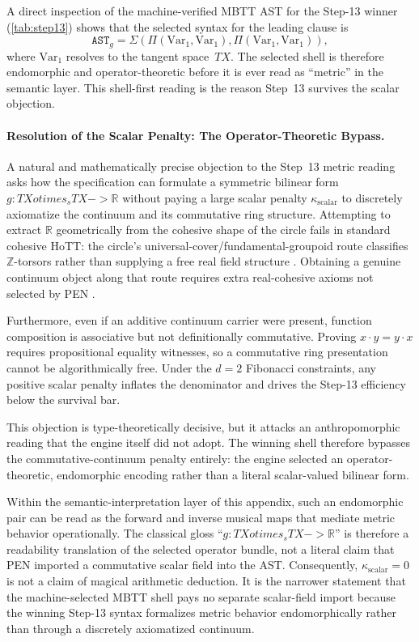 \documentclass[11pt,a4paper]{article}
\def\to{->}%
\def\otimes{otimes}%
\theoremstyle{plain}
\theoremstyle{definition}
\theoremstyle{remark}
\newcommand{\R}{\mathbb{R}}
\begin{document}
A direct inspection of the machine-verified MBTT AST for the Step-13 winner (\cref{tab:step13}) shows that the selected syntax for the leading clause is
\[
  \mathtt{AST}_g = \Sigma(\Pi(\mathrm{Var}_1, \mathrm{Var}_1), \Pi(\mathrm{Var}_1, \mathrm{Var}_1)),
\]
where $\mathrm{Var}_1$ resolves to the tangent space~$TX$.
The selected shell is therefore endomorphic and operator-theoretic before it is ever read as ``metric'' in the semantic layer.
This shell-first reading is the reason Step~13 survives the scalar objection.

\paragraph{Resolution of the Scalar Penalty: The Operator-Theoretic Bypass.}
A natural and mathematically precise objection to the Step~13 metric reading asks how the specification can formulate a symmetric bilinear form $g : TX \otimes_s TX \to \R$ without paying a large scalar penalty $\kappa_{\mathrm{scalar}}$ to discretely axiomatize the continuum and its commutative ring structure.
Attempting to extract $\R$ geometrically from the cohesive shape of the circle fails in standard cohesive HoTT: the circle's universal-cover/fundamental-groupoid route classifies $\mathbb{Z}$-torsors rather than supplying a free real field structure \cite{licata-shulman}.
Obtaining a genuine continuum object along that route requires extra real-cohesive axioms not selected by PEN \cite{shulman-real-cohesive}.

Furthermore, even if an additive continuum carrier were present, function composition is associative but not definitionally commutative.
Proving $x \cdot y = y \cdot x$ requires propositional equality witnesses, so a commutative ring presentation cannot be algorithmically free.
Under the $d=2$ Fibonacci constraints, any positive scalar penalty inflates the denominator and drives the Step-13 efficiency below the survival bar.

This objection is type-theoretically decisive, but it attacks an anthropomorphic reading that the engine itself did not adopt.
The winning shell therefore bypasses the commutative-continuum penalty entirely: the engine selected an operator-theoretic, endomorphic encoding rather than a literal scalar-valued bilinear form.

Within the semantic-interpretation layer of this appendix, such an endomorphic pair can be read as the forward and inverse musical maps that mediate metric behavior operationally.
The classical gloss ``$g : TX \otimes_s TX \to \R$'' is therefore a readability translation of the selected operator bundle, not a literal claim that PEN imported a commutative scalar field into the AST.
Consequently, $\kappa_{\mathrm{scalar}} = 0$ is not a claim of magical arithmetic deduction.
It is the narrower statement that the machine-selected MBTT shell pays no separate scalar-field import because the winning Step-13 syntax formalizes metric behavior endomorphically rather than through a discretely axiomatized continuum.
\end{document}
